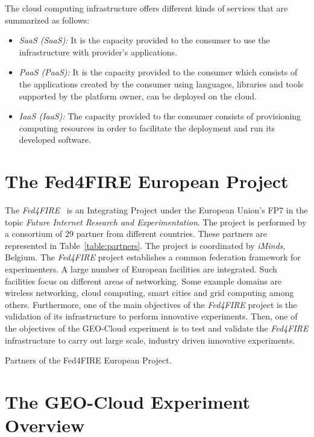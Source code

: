 The cloud computing infrastructure offers different kinds of services that are
summarized as follows:

\begin{itemize}
\item \emph{\acl{SaaS} (SaaS):} It is the capacity provided to the consumer
  to use  the infrastructure with provider's applications.
\item \emph{\acl{PaaS} (PaaS):} It is the capacity provided to the consumer which
  consists of the  applications created by the consumer using languages, libraries
  and tools supported by the platform owner, can be deployed on the cloud.
\item \emph{\acl{IaaS} (IaaS):} The capacity provided to the
  consumer consists of provisioning computing resources in order to facilitate
  the deployment and run its developed software.
\end{itemize}



\section{The Fed4FIRE European Project}%
The \emph{Fed4FIRE}~\cite{Fed4FIRE2014a} is an Integrating Project under the European Union's
\ac{FP7} in the topic \emph{Future
  Internet Research and Experimentation}. The project is performed by a
consortium of 29 partner from different countries. These partners are
represented in Table~\ref{table:partners}. The project is coordinated by
 \emph{iMinds}, Belgium.
The \emph{Fed4FIRE} project establishes a common federation framework for
experimenters. A large  number of European facilities are integrated. Such facilities focus on different  areas
of networking. Some example domains are wireless networking, cloud computing, smart
cities and grid computing among others.
Furthermore, one of the main objectives of the \emph{Fed4FIRE} project is the
validation of its infrastructure to perform
innovative experiments. Then, one of the objectives of the GEO-Cloud experiment
is to test and validate the \emph{Fed4FIRE} infrastructure to carry out large
scale, industry driven innovative experiments.
\begin{table}[hp]
  \centering
  {\small
  
  }
  \caption{Partners of the Fed4FIRE European Project.}
  \label{table:partners}
\end{table}

\section{The GEO-Cloud Experiment Overview}


